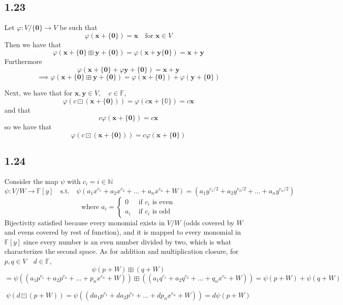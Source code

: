 \documentclass[letterpaper,12pt]{article}
\theoremstyle{definition}
\begin{document}
\subsection*{1.23}
Let $\varphi: V/\{\mathbf{0}\} \rightarrow V$ be such that 
\[ \varphi ( \mathbf{x} + \{\mathbf{0} \}) = \mathbf{x}  \quad \text{for }\mathbf{x} \in V\]
Then we have that 
\[ \varphi ( \mathbf{x} + \{\mathbf{0} \} \boxplus \mathbf{y} + \{\mathbf{0} \}) = \varphi ( \mathbf{x} + \mathbf{y}  \{\mathbf{0} \}) = \mathbf{x}  + \mathbf{y} \]
Furthermore \[\varphi ( \mathbf{x} + \{\mathbf{0} \}  + \varphi \mathbf{y} + \{\mathbf{0} \}) = \mathbf{x} + \mathbf{y} \]
\[ \implies \varphi ( \mathbf{x} + \{\mathbf{0} \} \boxplus \mathbf{y} + \{\mathbf{0} \}) = \varphi(\mathbf{x}  + \{\mathbf{0} \}) + \varphi(\mathbf{y}  + \{\mathbf{0} \}) \]

Next, we have that for $\mathbf{x} ,\mathbf{y} \in  V, \quad c \in \mathbb{F} $,
\[  \varphi(c \boxdot ( \mathbf{x} + \{\mathbf{0} \})) = \varphi(c \mathbf{x} + \{\mathbb{0} \}) = c \mathbf{x} \]
and that
\[c \varphi ( \mathbf{x} + \{ \mathbf{0} \}) = c \mathbf{x}  \]
so we have that 
\[ \varphi (c \boxdot (\mathbf{x}  + \{\mathbf{0} \})) = c \varphi (\mathbf{x}  + \{\mathbf{0} \})\]

\subsection*{1.24}

Consider the map $\psi$ with $c_i = i \in \mathbb{N}$
\[ \psi: V/W \rightarrow \mathbb{F}[y] \quad \text{s.t.} \quad \psi  (a_1x^{c_1} + a_2x^{c_2} + \dots + a_nx^{c_n} + W) = (a_1y^{c_1/2} + a_2y^{c_2/2} + \dots + a_ny^{c_n/2})\]
\[ \text{where } a_i = 
\begin{cases}
    0 & \text{ if $c_i$ is even}\\
    a_i & \text{ if $c_i$ is odd}
\end{cases}
\]
Bijectivity satisfied because every monomial exists in $V/W$ (odds covered by $W$ and evens covered by rest of function), and it is mapped to every monomial in $\mathbb{F}[y]$ since every number is an even number divided by two, which is what characterizes the second space.
As for addition and multiplication closure, for $p, q \in V \quad d \in \mathbb{F} $, 
\[ \psi(p + W) \boxplus (q + W) \]
\[ =\psi( (a_1p^{c_1} + a_2p^{c_2} + \dots + p_nx^{c_n} + W)) \boxplus ((a_1q^{c_1} + a_2q^{c_2} + \dots + q_nx^{c_n} + W)) = \psi(p+W) + \psi(q+ W)\]

\[ \psi(d \boxdot( p + W)) = \psi( (da_1p^{c_1} + da_2p^{c_2} + \dots + dp_nx^{c_n} + W)) =d \psi (p + W)\]
\end{document}
